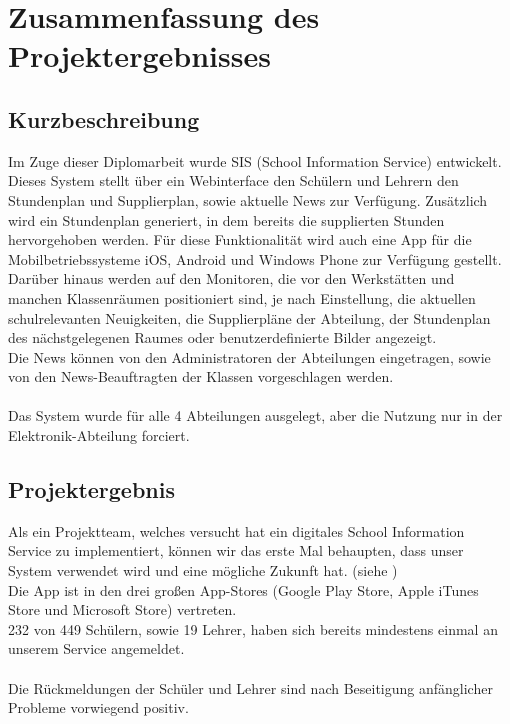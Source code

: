 \chapter[Zusammenfassung]{Zusammenfassung des Projektergebnisses}

\section{Kurzbeschreibung}
Im Zuge dieser Diplomarbeit wurde SIS (School Information Service) entwickelt. \\
Dieses System stellt über ein Webinterface den Schülern und Lehrern den Stundenplan und Supplierplan, sowie aktuelle News zur Verfügung. Zusätzlich wird ein Stundenplan generiert, in dem bereits die supplierten Stunden hervorgehoben werden.
Für diese Funktionalität wird auch eine App für die Mobilbetriebssysteme iOS, Android und Windows Phone zur Verfügung gestellt.\\
Darüber hinaus werden auf den Monitoren, die vor den Werkstätten und manchen Klassenräumen positioniert sind, je nach Einstellung, die aktuellen schulrelevanten Neuigkeiten, die Supplierpläne der Abteilung, der Stundenplan des nächstgelegenen Raumes oder benutzerdefinierte Bilder angezeigt.\\
Die News können von den Administratoren der Abteilungen eingetragen, sowie von den News-Beauftragten der Klassen vorgeschlagen werden.\\
\\
Das System wurde für alle 4 Abteilungen ausgelegt, aber die Nutzung nur in der Elektronik-Abteilung forciert.

\section{Projektergebnis}
Als ein Projektteam, welches versucht hat ein digitales School Information Service zu implementiert, können wir das erste Mal behaupten, dass unser System verwendet wird und eine mögliche Zukunft hat. (siehe )\\
Die App ist in den drei großen App-Stores (Google Play Store, Apple iTunes Store und Microsoft Store) vertreten.\\
232 von 449 Schülern, sowie 19 Lehrer, haben sich bereits mindestens einmal an unserem Service angemeldet. \\
\\
Die Rückmeldungen der Schüler und Lehrer sind nach Beseitigung anfänglicher Probleme vorwiegend positiv.

